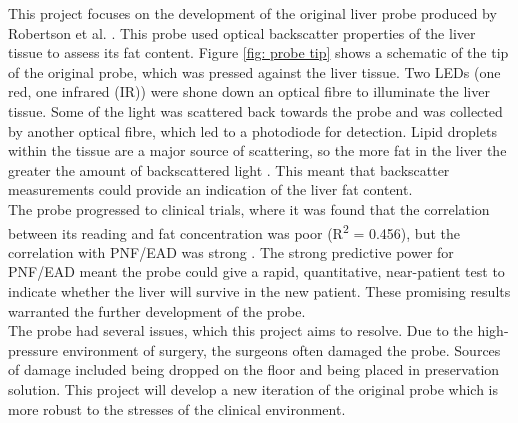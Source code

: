 This project focuses on the development of the original liver probe produced by Robertson et al. \cite{Robertson}. This probe used optical backscatter properties of the liver tissue to assess its fat content. Figure \ref{fig: probe tip} shows a schematic of the tip of the original probe, which was pressed against the liver tissue. Two LEDs (one red, one infrared (IR)) were shone down an optical fibre to illuminate the liver tissue. Some of the light was scattered back towards the probe and was collected by another optical fibre, which led to a photodiode for detection. Lipid droplets within the tissue are a major source of scattering, so the more fat in the liver the greater the amount of backscattered light \cite{McLaughlin}. This meant that backscatter measurements could provide an indication of the liver fat content.\\

The probe progressed to clinical trials, where it was found that the correlation between its reading and fat concentration was poor (R\textsuperscript{2} = 0.456), but the correlation with PNF/EAD was strong \cite{Robertson}. The strong predictive power for PNF/EAD meant the probe could give a rapid, quantitative, near-patient test to indicate whether the liver will survive in the new patient. These promising results warranted the further development of the probe.\\

The probe had several issues, which this project aims to resolve. Due to the high-pressure environment of surgery, the surgeons often damaged the probe. Sources of damage included being dropped on the floor and being placed in preservation solution. This project will develop a new iteration of the original probe which is more robust to the stresses of the clinical environment.




